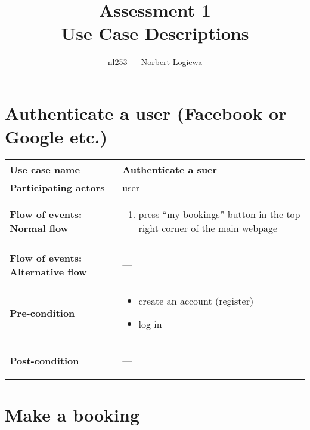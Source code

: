\documentclass[a4paper, 13pt, draft]{report}
\author{nl253 --- Norbert Logiewa}
\title{%
    \huge{\bf{Assessment 1}} \\ 
    Use Case Descriptions \\ 
}
\begin{document}
\maketitle

\newcommand{\notapplicable}{%
\begin{center} --- \end{center}
}

\section*{Authenticate a user (Facebook or Google etc.)}

\begin{center}
    \begin{tabular}{| >{\bf}l | p{5.55cm} |} 
	\hline
	Use case name & Authenticate a suer \\ 
	\hline
	Participating actors & user \\
	\hline
	Flow of events: Normal flow & 
	\begin{enumerate}		
	    \item press ``my bookings'' button in the top right corner of
		the main webpage
	\end{enumerate}	\\
	\hline
	Flow of events: Alternative flow & \notapplicable \\
	\hline
	Pre-condition & 
	\begin{itemize} 
	    \item create an account (register)
	    \item log in
	\end{itemize} \\
	\hline
	Post-condition & \notapplicable \\ 
	\hline
    \end{tabular}
\end{center}

\section*{Make a booking}
\end{document}
